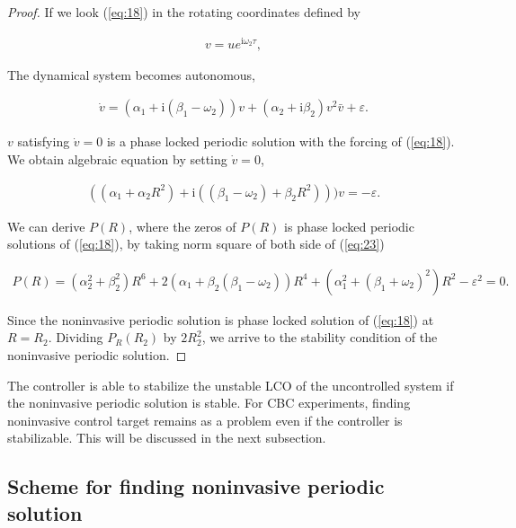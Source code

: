 \documentclass[openacc]{rsproca_new}%
\def\epsilon{\varepsilon}
\newcommand{\Eref}[1]{(\ref{#1})}
\begin{document}
\begin{proof}
If we look \Eref{eq:18} in the rotating coordinates defined by

\begin{align}\label{eq:21}
  v=ue^{\textrm{i}\omega_2 \tau},
\end{align}

\noindent The dynamical system becomes autonomous,

\begin{align}\label{eq:22}
  \dot v=(\alpha_1+\textrm{i}(\beta_1-\omega_2))v+(\alpha_2+\textrm{i}\beta_2)v^2\bar{v}+\epsilon.
\end{align}

\noindent $v$ satisfying $\dot v=0$ is a phase locked periodic solution with the forcing of \Eref{eq:18}. We obtain algebraic equation by setting $\dot v=0$,

\begin{align}\label{eq:23}
  ((\alpha_1+\alpha_2R^2)+\textrm{i}((\beta_1-\omega_2)+\beta_2 R^2)))v=-\epsilon.
\end{align}

\noindent We can derive $P(R)$, where the zeros of $P(R)$ is phase locked periodic solutions of \Eref{eq:18}, by taking norm square of both side of \Eref{eq:23}

\begin{align}\label{eq:24}
  P(R)=(\alpha_2^2+\beta_2^2)R^6+2(\alpha_1+\beta_2(\beta_1-\omega_2))R^4+(\alpha_1^2+(\beta_1+\omega_2)^2)R^2-\epsilon^2=0.
\end{align}

\noindent Since the noninvasive periodic solution is phase locked solution of \Eref{eq:18} at $R=R_2$. Dividing $P_R(R_2)$ by $2R_2^2$, we arrive to the stability condition of the noninvasive periodic solution.
\end{proof}

\noindent The controller is able to stabilize the unstable LCO of the uncontrolled system if the noninvasive periodic solution is stable. For CBC experiments, finding noninvasive control target remains as a problem even if the controller is stabilizable. This will be discussed in the next subsection.

\subsection{Scheme for finding noninvasive periodic solution}\label{FNP}
\end{document}
